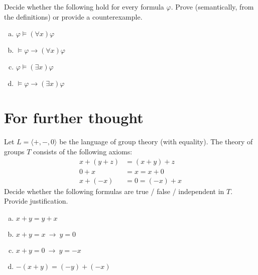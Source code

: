 \begin{problem}
    
    Decide whether the following hold for every formula $\varphi$. Prove (semantically, from the definitions) or provide a counterexample.
    \begin{enumerate}[(a)]
       \item $\varphi \models (\forall x)\varphi$
       \item $\models \varphi \to (\forall x)\varphi$
       \item $\varphi \models (\exists x)\varphi$
       \item $\models \varphi \to (\exists x)\varphi$
    \end{enumerate}

\end{problem}


\section*{For further thought}


\begin{problem}

    Let $L=\langle +, -, 0\rangle$ be the language of group theory (with equality). The theory of groups $T$ consists of the following axioms:
    \begin{align*}
    x+(y+z)&=(x+y)+z\\
    0+x&=x=x+0\\
    x+(-x)&=0=(-x)+x
    \end{align*}
    Decide whether the following formulas are true / false / independent in $T$. Provide justification.
    \begin{enumerate}[(a)]
        \item $x+y=y+x$
        \item $x+y=x\ \rightarrow\ y=0$
        \item $x+y=0\ \rightarrow\ y=-x$
        \item $-(x+y)=(-y)+(-x)$
    \end{enumerate}

\end{problem}




